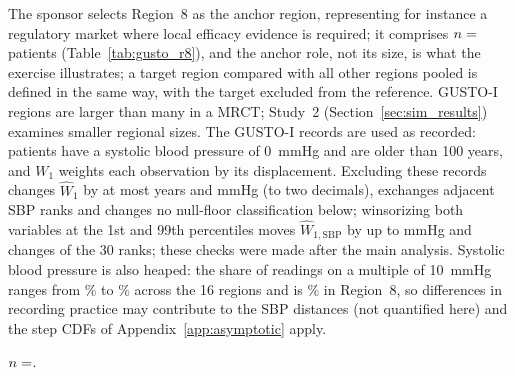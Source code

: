 \documentclass[AMA,Times1COL]{WileyNJDv5}
\begin{document}
The sponsor selects Region~8 as the anchor region, representing for instance a regulatory market where local efficacy evidence is required; it comprises $n = \numval{nR8}$ patients (Table~\ref{tab:gusto_r8}), and the anchor role, not its size, is what the exercise illustrates; a target region compared with all other regions pooled is defined in the same way, with the target excluded from the reference. GUSTO-I regions are larger than many in a MRCT; Study~2 (Section~\ref{sec:sim_results}) examines smaller regional sizes. The GUSTO-I records are used as recorded:  patients have a systolic blood pressure of 0~mmHg and  are older than 100 years, and $W_1$ weights each observation by its displacement. Excluding these records changes $\widehat{W}_1$ by at most  years and  mmHg (to two decimals), exchanges  adjacent SBP ranks and changes no null-floor classification below; winsorizing both variables at the 1st and 99th percentiles moves $\widehat{W}_{1,\text{SBP}}$ by up to  mmHg and changes  of the 30 ranks; these checks were made after the main analysis. Systolic blood pressure is also heaped: the share of readings on a multiple of 10~mmHg ranges from \% to \% across the 16 regions and is \% in Region~8, so differences in recording practice may contribute to the SBP distances (not quantified here) and the step CDFs of Appendix~\ref{app:asymptotic} apply.

\begin{table}[ht]
\centering
\caption{Region~8 baseline characteristics (GUSTO-I).\label{tab:gusto_r8}}
\begin{tablenotes}
\item $n = \numval{nR8note}$.
\end{tablenotes}
\end{table}
\end{document}
